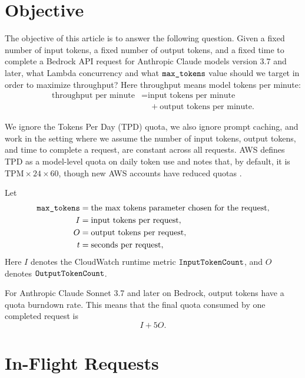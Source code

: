 \documentclass[12pt]{extarticle}
\title{\doctitle}
\author{Jeremy Jacobson}
\date{April 27, 2026}
\newcommand{\maxtok}{\text{\texttt{max\_tokens}}}
\newcommand{\inputmetric}{\text{\texttt{InputTokenCount}}}
\newcommand{\outputmetric}{\text{\texttt{OutputTokenCount}}}
\newcommand{\inputtokens}{I}
\newcommand{\outputtokens}{O}
\newcommand{\TPM}{\text{TPM}}
\begin{document}
\maketitle
\thispagestyle{firstpage}

\section{Objective}

The objective of this article is to answer the following question. Given a fixed number of input tokens, a fixed number of output tokens, and a fixed time to complete a Bedrock API request for Anthropic Claude models version 3.7 and later, what Lambda concurrency and what $\maxtok$ value should we target in order to maximize throughput? Here throughput means model tokens per minute:
\[
\begin{aligned}
\text{throughput per minute}
&= \text{input tokens per minute}\\
&\quad + \text{output tokens per minute}.
\end{aligned}
\]

We ignore the Tokens Per Day (TPD) quota, we also ignore prompt caching, and work in the setting where we assume the number of input tokens, output tokens, and time to complete a request, are constant across all requests. AWS defines TPD as a model-level quota on daily token use and notes that, by default, it is $\TPM \times 24 \times 60$, though new AWS accounts have reduced quotas \cite{bedrock-quotas}.

Let
\[
\begin{aligned}
\maxtok &= \text{the max tokens parameter chosen for the request},\\
\inputtokens &= \text{input tokens per request},\\
\outputtokens &= \text{output tokens per request},\\
t &= \text{seconds per request},
\end{aligned}
\]
Here $\inputtokens$ denotes the CloudWatch runtime metric $\inputmetric$, and $\outputtokens$ denotes $\outputmetric$.

For Anthropic Claude Sonnet 3.7 and later on Bedrock, output tokens have a quota burndown rate. This means that the final quota consumed by one completed request is
\[
\inputtokens + 5\outputtokens.
\]

\section{In-Flight Requests}
\end{document}
